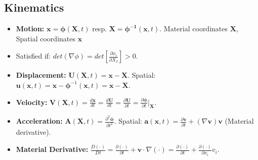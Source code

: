 \documentclass[10pt,twocolumn, a4paper]{article}
\begin{document}
\subsection{Kinematics}
\begin{itemize}
    \item \textbf{Motion:} $\bm{x} = \bm{\phi}(\bm{X}, t)$ resp. $\bm{X} = \bm{\phi^{-1}}(\bm{x}, t)$. Material coordinates $\bm{X}$, Spatial coordinates $\bm{x}$
    \item Satisfied if: $det(\nabla \phi) = det[\frac{\partial x_i}{\partial X_I}] > 0$.
    \item \textbf{Displacement:} $\bm{U}(\bm{X}, t) = \bm{x} - \bm{X}$. Spatial: $\bm{u}(\bm{x}, t) = \bm{x} - \bm{\phi}^{-1}(\bm{x}, t) = \bm{x} - \bm{X}$.
    \item \textbf{Velocity:} $\bm{V}(\bm{X}, t) = \frac{d\bm{x}}{dt} = \frac{d\bm{U}}{dt} = \frac{\partial \bm{U}}{\partial t} = \frac{\partial \bm{\phi}}{\partial t} \big|_{\bm{X}}$.
    \item \textbf{Acceleration:} $\bm{A}(\bm{X}, t) = \frac{\partial^2 \bm{\phi}}{\partial t^2}$. Spatial: $\bm{a}(\bm{x}, t) = \frac{\partial \bm{v}}{\partial t} + (\nabla \bm{v})\bm{v}$ (Material derivative).
    \item \textbf{Material Derivative:} $\frac{D (\cdot)}{Dt} = \frac{\partial (\cdot)}{\partial t} + \bm{v} \cdot \nabla (\cdot) = \frac{\partial (\cdot)}{\partial t} + \frac{\partial(\cdot)}{\partial x_i} v_i$.
\end{itemize}
\end{document}
